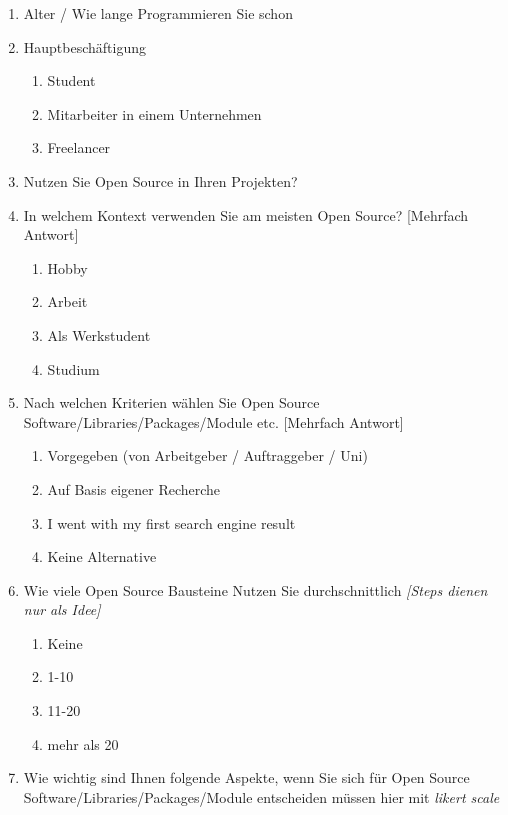 \begin{enumerate}
    \item Alter / Wie lange Programmieren Sie schon
    \item Hauptbeschäftigung
          \begin{enumerate}
              \item Student
              \item Mitarbeiter in einem Unternehmen
              \item Freelancer
          \end{enumerate}
    \item Nutzen Sie Open Source in Ihren Projekten?
    \item In welchem Kontext verwenden Sie am meisten Open Source? [Mehrfach Antwort]
          \begin{enumerate}
              \item Hobby
              \item Arbeit
              \item Als Werkstudent
              \item Studium
          \end{enumerate}
    \item Nach welchen Kriterien wählen Sie Open Source Software/Libraries/Packages/Module etc. [Mehrfach Antwort]
          \begin{enumerate}
              \item Vorgegeben (von Arbeitgeber / Auftraggeber / Uni)
              \item Auf Basis eigener Recherche
              \item I went with my first search engine result
              \item Keine Alternative
          \end{enumerate}
    \item Wie viele Open Source Bausteine Nutzen Sie durchschnittlich \textit{[Steps dienen nur als Idee]}
          \begin{enumerate}
              \item Keine
              \item 1-10
              \item 11-20
              \item mehr als 20
          \end{enumerate}
    \item Wie wichtig sind Ihnen folgende Aspekte, wenn Sie sich für Open Source
          Software/Libraries/Packages/Module entscheiden müssen hier mit \textit{likert scale}

\end{enumerate}

